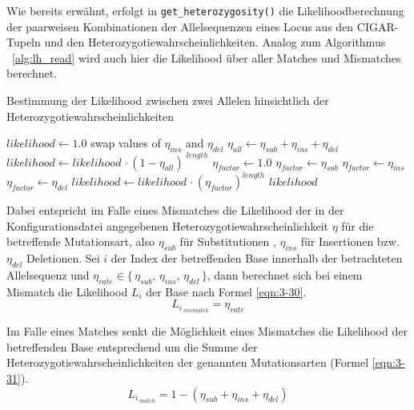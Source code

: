 Wie bereits erwähnt, erfolgt in \lstinline|get_heterozygosity()| die Likelihoodberechnung der paarweisen Kombinationen der Allelsequenzen eines Locus aus den CIGAR-Tupeln und den Heterozygotiewahrscheinlichkeiten. Analog zum Algorithmus ~\ref{alg:lh_read} wird auch hier die Likelihood über aller Matches und Mismatches berechnet.\\

\begin{algorithm}[H]
	\caption{Bestimmung der Likelihood zwischen zwei Allelen hinsichtlich der Heterozygotiewahrscheinlichkeiten}  \label{alg:lh_het}
	\begin{algorithmic}[1]	
		\State $likelihood \gets 1.0$
		\State swap values of $\eta_{ins}$ and $\eta_{del}$
		\EndIf
		\State $\eta_{all} \gets \eta_{sub}+\eta_{ins}+\eta_{del}$
		\State $ likelihood \gets likelihood \, \cdotp (1 - \eta_{all})^{\;length} $
		\EndIf		    
		\State $ \eta_{factor} \gets 1.0$			    	
		\State $\eta_{factor} \gets \eta_{sub}$
		\EndIf	
		\State $\eta_{factor} \gets \eta_{ins}$
		\EndIf
		\State $\eta_{factor} \gets \eta_{del}$
		\EndIf
		\State $ likelihood \gets likelihood \, \cdotp (\eta_{factor})^{length}$
		\EndIf
		\EndFor
		\State \Return $ likelihood $
		\EndFunction
	\end{algorithmic}
\end{algorithm}

Dabei entspricht im Falle eines Mismatches die Likelihood der in der Konfigurationsdatei angegebenen Heterozygotiewahrscheinlichkeit $ \eta $ für die betreffende Mutationsart, also $ \eta_{sub} $ für Substitutionen , $ \eta_{ins} $ für Insertionen bzw. $ \eta_{del} $ Deletionen. Sei $i$ der Index der betreffenden Base innerhalb der betrachteten Allelsequenz und $ \eta_{rate} \in \{\,\eta_{sub},\, \eta_{ins},\, \eta_{del}\,\}$, dann berechnet sich bei einem Mismatch die Likelihood $L_{i}$ der Base nach Formel \eqref{eqn:3-30}.
\begin{equation} \label{eqn:3-30}
\tag{3-30}
L_{i\,_{mismatch}} = \eta_{rate}
\end{equation}

Im Falle eines Matches senkt die Möglichkeit eines Mismatches die Likelihood der betreffenden Base entsprechend um die Summe der Heterozygotiewahrscheinlichkeiten der genannten Mutationsarten (Formel \eqref{eqn:3-31}).
\begin{equation} \label{eqn:3-31}
\tag{3-31}
L_{i\,_{match}} = 1 - (\eta_{sub} + \eta_{ins} + \eta_{del})
\end{equation}

